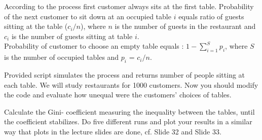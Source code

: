 \documentclass{WeSTassignment}
\begin{document}
According to the process first customer always sits at the first table. 
Probability of the next customer to sit down at an occupied table $i$ equals 
 ratio of guests sitting at the table ($c_i/n$), where $n$ is the number of guests in the restaurant and $c_i$ is the number of guests sitting at table $i$.\\
 Probability of customer to choose an empty table equals :  $1- \sum_{i=1}^{S}{p_i}$, where $S$ is the number of occupied tables and ${p_i}$ = $c_i/n$.
 
Provided script simulates the process and returns number of people sitting at each table. We will study restaurants for 1000 customers.
Now you should modify the code and evaluate how unequal were the customers' choices of tables.   



Calculate the Gini-
coefficient measuring the inequality between the tables,
until the coefficient stabilizes. Do five different runs and plot your results in a similar way that plots in the lecture slides are done, cf. Slide 32 and Slide 33.
\end{document}
